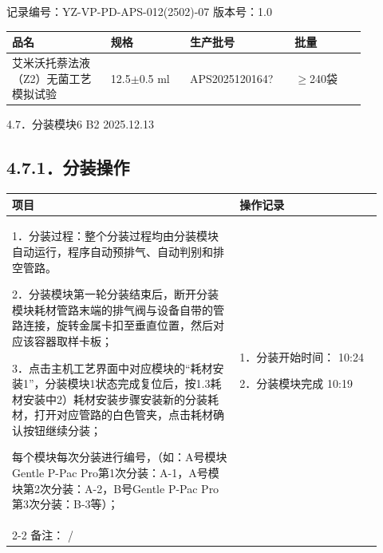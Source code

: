 \documentclass[UTF8,10pt,a4paper,fontset=fandol]{ctexart}
\newcommand{\fieldvalue}[1]{#1}
\newcommand{\handwritten}[1]{#1}
\begin{document}
\begin{center}
记录编号：YZ-VP-PD-APS-012(2502)-07 \quad 版本号：1.0
\end{center}

\begin{tabular}{|p{0.25\linewidth}|p{0.20\linewidth}|p{0.25\linewidth}|p{0.18\linewidth}|}
\hline
品名 & 规格 & 生产批号 & 批量 \\
\hline
\fieldvalue{艾米沃托萘法液（Z2）无菌工艺模拟试验}
&
\fieldvalue{12.5$\pm$0.5 ml}
&
\fieldvalue{\handwritten{APS2025120164?}}
&
\fieldvalue{\handwritten{$\geq$240}}袋 \\
\hline
\end{tabular}

\vspace{0.5em}

4.7．分装模块6
\quad
\fieldvalue{\handwritten{B2}}
\quad
\fieldvalue{\handwritten{2025.12.13}}

\subsection*{4.7.1．分装操作}

\begin{tabular}{|p{0.57\linewidth}|p{0.35\linewidth}|}
\hline
项目 & 操作记录 \\
\hline
1．分装过程：整个分装过程均由分装模块自动运行，程序自动预排气、自动判别和排空管路。

2．分装模块第一轮分装结束后，断开分装模块耗材管路末端的排气阀与设备自带的管路连接，旋转金属卡扣至垂直位置，然后对应该容器取样卡板；

3．点击主机工艺界面中对应模块的“耗材安装1”，分装模块1状态完成复位后，按1.3耗材安装中2）耗材安装步骤安装新的分装耗材，打开对应管路的白色管夹，点击耗材确认按钮继续分装；

每个模块每次分装进行编号，（如：A号模块Gentle P-Pac Pro第1次分装：A-1，A号模块第2次分装：A-2，B号Gentle P-Pac Pro第3次分装：B-3等）； &
1．分装开始时间：
\fieldvalue{\handwritten{10:24}}

2．分装模块完成
\fieldvalue{\handwritten{10:19}}

\\
\cline{2-2}
备注：
\fieldvalue{\handwritten{/}}
&
\\
\hline
\end{tabular}
\end{document}
